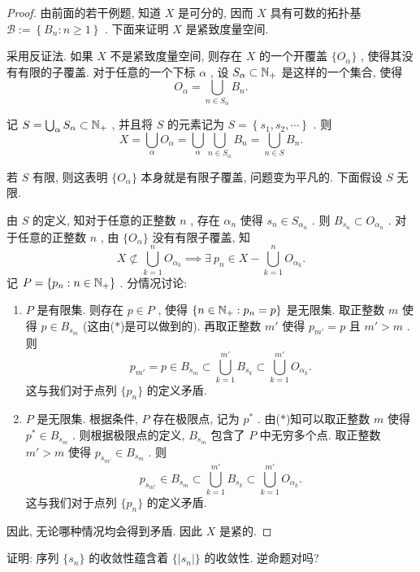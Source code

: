 \documentclass{article}
\begin{document}
\begin{proof}
    由前面的若干例题, 知道 \( X \) 是可分的, 因而 \( X \) 具有可数的拓扑基 \( \mathcal{B}:=\left\{B_n:n\ge 1\right\} \) . 下面来证明 \( X \) 是紧致度量空间. \par
    采用反证法. 如果 \( X \) 不是紧致度量空间, 则存在 \( X \) 的一个开覆盖 \( \{O_\alpha\} \) , 使得其没有有限的子覆盖. 对于任意的一个下标 \( \alpha \) , 设 \( S_\alpha\subset\mathbb{N}_+ \) 是这样的一个集合, 使得
    \[ O_\alpha=\bigcup_{n\in S_\alpha}B_n. \] \par
    记 \( S=\bigcup_{\alpha}S_\alpha\subset\mathbb{N}_+ \) , 并且将 \( S \) 的元素记为 \( S=\left\{s_1,s_2,\cdots\right\} \) . 则
    \[ X=\bigcup_{\alpha}O_\alpha=\bigcup_{\alpha}\bigcup_{n\in S_\alpha}B_n=\bigcup_{n\in S}B_n. \tag{\( \ast \)}\]  \par
    若 \( S \) 有限, 则这表明 \( \{O_\alpha\} \) 本身就是有限子覆盖, 问题变为平凡的. 下面假设 \( S \) 无限. \par
    由 \( S \) 的定义, 知对于任意的正整数 \( n \) , 存在 \( \alpha_n \) 使得 \( s_n\in S_{\alpha_n} \) . 则 \( B_{s_n}\subset O_{\alpha_n} \) . 对于任意的正整数 \( n \) , 由 \( \{O_\alpha\} \) 没有有限子覆盖, 知
    \[ X\not\subset\bigcup_{k=1}^{n}O_{\alpha_k}\implies\exists\ p_n\in X-\bigcup_{k=1}^{n}O_{\alpha_k}. \]
    记 \( P=\{p_n:n\in\mathbb{N}_+\} \) . 分情况讨论:
    \begin{enumerate}[label=(\alph*)]
        \item  \( P \) 是有限集. 则存在 \( p\in P \) , 使得 \( \left\{n\in\mathbb{N}_+:p_n=p\right\} \) 是无限集. 取正整数 \( m \) 使得 \( p\in B_{s_m} \) (这由(\( \ast \))是可以做到的). 再取正整数 \( m' \) 使得 \( p_{m'}=p \) 且 \( m'>m \) . 则
        \[ p_{m'}=p\in B_{s_m}\subset\bigcup_{k=1}^{m'} B_{s_k}\subset\bigcup_{k=1}^{m'} O_{\alpha_k}. \] 
        这与我们对于点列 \( \{p_n\} \) 的定义矛盾.
        \item  \( P \) 是无限集. 根据条件,  \( P \) 存在极限点, 记为 \( p^* \) . 由(\( \ast \))知可以取正整数 \( m \) 使得 \( p^*\in B_{s_m} \) . 则根据极限点的定义,  \( B_{s_m} \) 包含了 \( P \) 中无穷多个点. 取正整数 \( m'>m \) 使得 \( p_{s_{m'}}\in B_{s_m} \) . 则
        \[ p_{s_{m'}}\in B_{s_m}\subset\bigcup_{k=1}^{m'} B_{s_k}\subset\bigcup_{k=1}^{m'} O_{\alpha_k}. \] 
        这与我们对于点列 \( \{p_n\} \) 的定义矛盾.
    \end{enumerate}\par
    因此, 无论哪种情况均会得到矛盾. 因此 \( X \) 是紧的.
\end{proof}

\begin{problem}[3-1]
    证明: 序列 \( \{s_n\} \) 的收敛性蕴含着 \( \{|s_n|\} \) 的收敛性. 逆命题对吗?
\end{problem}
\end{document}

